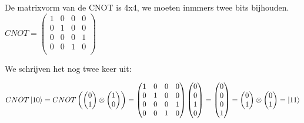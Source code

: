 \documentclass[../../main.tex]{subfiles}
\begin{document}
De matrixvorm van de CNOT is 4x4, we moeten inmmers twee bits bijhouden.
$CNOT = 
\begin{pmatrix}
1&0&0&0\\
0&1&0&0\\
0&0&0&1\\
0&0&1&0\\
\end{pmatrix}
$

We schrijven het nog twee keer uit:

$
CNOT\ket{10}=CNOT
\begin{pmatrix}
\begin{pmatrix}
0\\
1
\end{pmatrix}
\otimes
\begin{pmatrix}
1\\
0
\end{pmatrix}
\end{pmatrix}
=
\begin{pmatrix}
1&0&0&0\\
0&1&0&0\\
0&0&0&1\\
0&0&1&0\\
\end{pmatrix}
\begin{pmatrix}
0\\
0\\
1\\
0
\end{pmatrix}
=
\begin{pmatrix}
0\\
0\\
0\\
1
\end{pmatrix}
=
\begin{pmatrix}
0\\
1
\end{pmatrix}
\otimes
\begin{pmatrix}
0\\
1
\end{pmatrix}
=
\ket{11}
$
\end{document}
